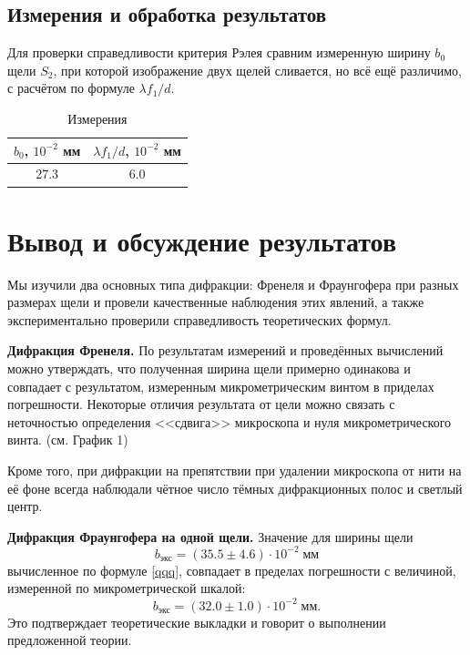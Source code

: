 \documentclass[a4paper,12pt]{article} %
\begin{document}
\subsection{Измерения и обработка результатов}

Для проверки справедливости критерия Рэлея сравним измеренную ширину $b_0$ щели $S_2$, при которой изображение двух щелей сливается, но всё ещё различимо, с расчётом по формуле $\lambda f_1/d$.

\begin{table}[h!]
	\centering
	\caption{Измерения}
	\begin{tabular}{|c|c|} \hline
		$b_0$, $10^{-2}$ мм &	$\lambda f_1/d$, $10^{-2}$ мм \\
		\hline
		27.3 &	6.0 \\ \hline
	\end{tabular}   
\end{table}

\section{Вывод и обсуждение результатов}
Мы изучили два основных типа дифракции: Френеля и Фраунгофера при разных размерах щели и провели качественные наблюдения этих явлений, а также экспериментально проверили справедливость теоретических формул.

\textbf{Дифракция Френеля.} По результатам измерений и проведённых вычислений можно утверждать, что полученная ширина щели примерно одинакова и совпадает с результатом, измеренным микрометрическим винтом в приделах погрешности. Некоторые отличия результата от цели можно связать с неточностью определения <<сдвига>> микроскопа и нуля микрометрического винта. (см. График 1)

Кроме того, при дифракции на препятствии при удалении микроскопа от нити на её фоне всегда наблюдали чётное число тёмных дифракционных полос и светлый центр.

\textbf{Дифракция Фраунгофера на одной щели.} Значение для ширины щели
\begin{equation}
\boxed{b_\text{экс} =  (35.5 \pm 4.6) \cdot 10^{-2} \; \text{мм}} 
\end{equation}
вычисленное по формуле \eqref{qqq}, совпадает в пределах погрешности с величиной, измеренной по микрометрической шкалой:
\begin{equation}\label{key}
\boxed{b_\text{экс} =  (32.0 \pm 1.0) \cdot 10^{-2} \; \text{мм}.} 
\end{equation}
Это подтверждает теоретические выкладки и говорит о выполнении предложенной теории.
\end{document}
